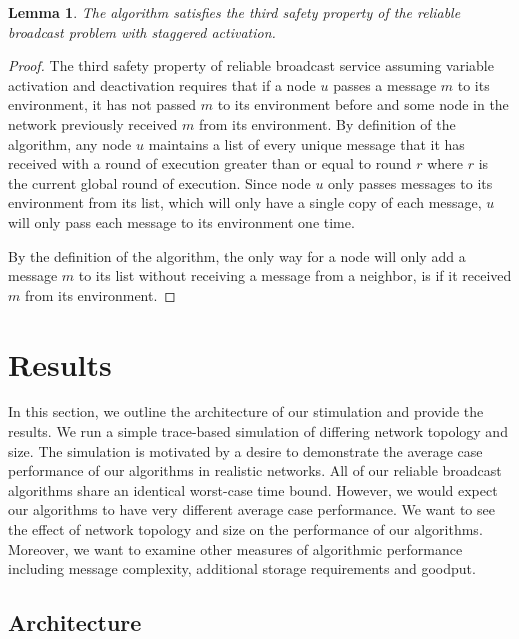 \documentclass[english]{article}
\newtheorem{lemma}[theorem]{Lemma}
\begin{document}
\begin{lemma}
\label{DeactivationRBSafety3}
The algorithm satisfies the third safety property of the reliable broadcast problem with staggered activation.
\end{lemma}
\begin{proof}

The third safety property of reliable broadcast service assuming variable activation and deactivation requires that if a node $u$ passes a message $m$ to its environment, it has not passed $m$ to its environment before and some node in the network previously received $m$ from its environment. By definition of the algorithm, any node $u$ maintains a list of every unique message that it has received with a round of execution greater than or equal to round $r$ where $r$ is the current global round of execution. Since node $u$ only passes messages to its environment from its list, which will only have a single copy of each message, $u$ will only pass each message to its environment one time. 

By the definition of the algorithm, the only way for a node will only add a message $m$ to its list without receiving a message from a neighbor, is if it received $m$ from its environment.


\end{proof}



\section{Results}

In this section, we outline the architecture of our stimulation and provide the results. We run a simple trace-based simulation of differing network topology and size. The simulation is motivated by a desire to demonstrate the average case performance of our algorithms in realistic networks. All of our reliable broadcast algorithms share an identical worst-case time bound. However, we would expect our algorithms to have very different average case performance. We want to see the effect of network topology and size on the performance of our algorithms. Moreover, we want to examine other measures of algorithmic performance including message complexity, additional storage requirements and goodput.

\subsection{Architecture}
\end{document}
